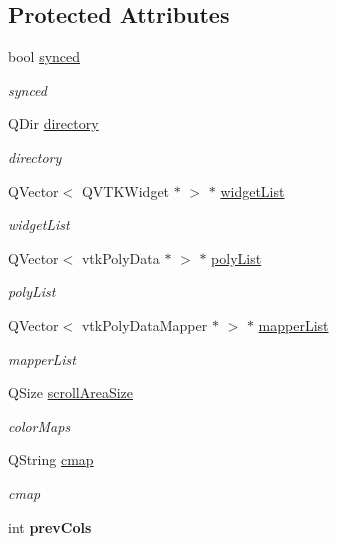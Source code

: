 \subsection*{Protected Attributes}
\begin{DoxyCompactItemize}
\item 
bool \hyperlink{class_shape_population_viewer_a42b6a8e7a7b2c90615e73c80988f547d}{synced}
\begin{DoxyCompactList}\small\item\em synced \end{DoxyCompactList}\item 
Q\-Dir \hyperlink{class_shape_population_viewer_aa466212a0536242cedb4233e4cf6492b}{directory}
\begin{DoxyCompactList}\small\item\em directory \end{DoxyCompactList}\item 
Q\-Vector$<$ Q\-V\-T\-K\-Widget $\ast$ $>$ $\ast$ \hyperlink{class_shape_population_viewer_adaf84d2191b3d5452455bf43864ad2f2}{widget\-List}
\begin{DoxyCompactList}\small\item\em widget\-List \end{DoxyCompactList}\item 
Q\-Vector$<$ vtk\-Poly\-Data $\ast$ $>$ $\ast$ \hyperlink{class_shape_population_viewer_a5533e0d642467a70e349fa79a24bfc51}{poly\-List}
\begin{DoxyCompactList}\small\item\em poly\-List \end{DoxyCompactList}\item 
Q\-Vector$<$ vtk\-Poly\-Data\-Mapper $\ast$ $>$ $\ast$ \hyperlink{class_shape_population_viewer_a512b562448c7236c0c1bdf981a0a7322}{mapper\-List}
\begin{DoxyCompactList}\small\item\em mapper\-List \end{DoxyCompactList}\item 
\hypertarget{class_shape_population_viewer_ae3bbe127e4bac8870cb476084a6d4917}{Q\-Size \hyperlink{class_shape_population_viewer_ae3bbe127e4bac8870cb476084a6d4917}{scroll\-Area\-Size}}\label{class_shape_population_viewer_ae3bbe127e4bac8870cb476084a6d4917}

\begin{DoxyCompactList}\small\item\em color\-Maps \end{DoxyCompactList}\item 
Q\-String \hyperlink{class_shape_population_viewer_a69f478eade0bf23b94037e5a09dfc127}{cmap}
\begin{DoxyCompactList}\small\item\em cmap \end{DoxyCompactList}\item 
\hypertarget{class_shape_population_viewer_aa9022fa806169eef3b46a053cc1e11ce}{int {\bfseries prev\-Cols}}\label{class_shape_population_viewer_aa9022fa806169eef3b46a053cc1e11ce}


\end{DoxyCompactItemize}
